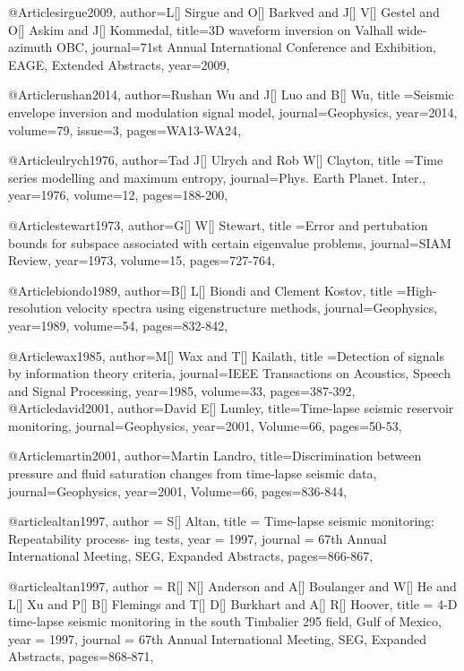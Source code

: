 @Article{sirgue2009,
  author={L[] Sirgue and O[] Barkved and J[] V[] Gestel and O[] Askim and J[] Kommedal},
  title={3{D} waveform inversion on Valhall wide-azimuth {OBC}},
  journal={71st Annual International Conference and Exhibition, EAGE, Extended Abstracts},
  year=2009,
}

@Article{rushan2014,
  author={Rushan Wu and J[] Luo and B[] Wu},
  title ={Seismic envelope inversion and modulation signal model},
  journal={Geophysics},
  year=2014,
  volume=79,
  issue=3,
  pages={WA13-WA24},
}



@Article{ulrych1976,
  author={Tad J[] Ulrych and Rob W[] Clayton},
  title ={Time series modelling and maximum entropy},
  journal={Phys. Earth Planet. Inter.},
  year=1976,
  volume=12,
  pages={188-200},
}

@Article{stewart1973,
  author={G[] W[] Stewart},
  title ={Error and pertubation bounds for subspace associated with certain eigenvalue problems},
  journal={SIAM Review},
  year=1973,
  volume=15,
  pages={727-764},
}

@Article{biondo1989,
  author={B[] L[] Biondi and Clement Kostov},
  title ={High-resolution velocity spectra using eigenstructure methods},
  journal={Geophysics},
  year=1989,
  volume=54,
  pages={832-842},
}

@Article{wax1985,
  author={M[] Wax and T[] Kailath},
  title ={Detection of signals by information theory criteria},
  journal={IEEE Transactions on Acoustics, Speech and Signal Processing},
  year=1985,
  volume=33,
  pages={387-392},
}
@Article{david2001,
  author={David E[] Lumley},
  title={Time-lapse seismic reservoir monitoring},
  journal={Geophysics},
  year=2001,
  Volume=66,
  pages={50-53},
}

@Article{martin2001,
  author={Martin Landro},
  title={Discrimination between pressure and fluid saturation changes from time‐lapse seismic data},
  journal={Geophysics},
  year=2001,
  Volume=66,
  pages={836-844},
}

@article{altan1997,
  author =	 {S[] Altan},
  title =	 {Time-lapse seismic monitoring: Repeatability process-
ing tests},
  year =	 1997,
  journal =	 {67th Annual International Meeting, SEG, Expanded Abstracts},
 pages=866-867,
}

@article{altan1997,
  author =	 {R[] N[] Anderson and A[] Boulanger and W[] He and L[] Xu and P[] B[] Flemings and T[] D[] Burkhart and A[] R[] Hoover},
  title =	 {4-D time-lapse seismic
monitoring in the south Timbalier 295 field, Gulf of Mexico},
  year =	 1997,
  journal =	 {67th Annual International Meeting, SEG, Expanded Abstracts},
 pages=868-871,
}

